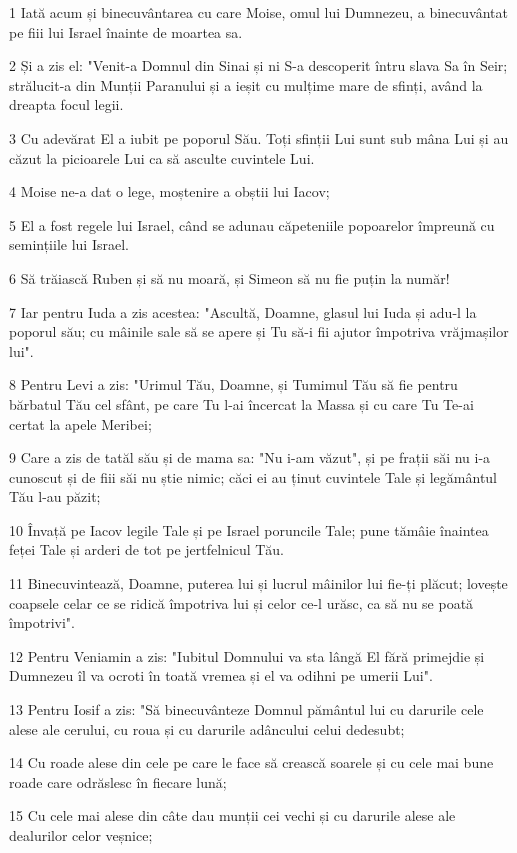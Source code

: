 \par 1 Iată acum și binecuvântarea cu care Moise, omul lui Dumnezeu, a binecuvântat pe fiii lui Israel înainte de moartea sa.
\par 2 Și a zis el: "Venit-a Domnul din Sinai și ni S-a descoperit întru slava Sa în Seir; strălucit-a din Munții Paranului și a ieșit cu mulțime mare de sfinți, având la dreapta focul legii.
\par 3 Cu adevărat El a iubit pe poporul Său. Toți sfinții Lui sunt sub mâna Lui și au căzut la picioarele Lui ca să asculte cuvintele Lui.
\par 4 Moise ne-a dat o lege, moștenire a obștii lui Iacov;
\par 5 El a fost regele lui Israel, când se adunau căpeteniile popoarelor împreună cu semințiile lui Israel.
\par 6 Să trăiască Ruben și să nu moară, și Simeon să nu fie puțin la număr!
\par 7 Iar pentru Iuda a zis acestea: "Ascultă, Doamne, glasul lui Iuda și adu-l la poporul său; cu mâinile sale să se apere și Tu să-i fii ajutor împotriva vrăjmașilor lui".
\par 8 Pentru Levi a zis: "Urimul Tău, Doamne, și Tumimul Tău să fie pentru bărbatul Tău cel sfânt, pe care Tu l-ai încercat la Massa și cu care Tu Te-ai certat la apele Meribei;
\par 9 Care a zis de tatăl său și de mama sa: "Nu i-am văzut", și pe frații săi nu i-a cunoscut și de fiii săi nu știe nimic; căci ei au ținut cuvintele Tale și legământul Tău l-au păzit;
\par 10 Învață pe Iacov legile Tale și pe Israel poruncile Tale; pune tămâie înaintea feței Tale și arderi de tot pe jertfelnicul Tău.
\par 11 Binecuvintează, Doamne, puterea lui și lucrul mâinilor lui fie-ți plăcut; lovește coapsele celar ce se ridică împotriva lui și celor ce-l urăsc, ca să nu se poată împotrivi".
\par 12 Pentru Veniamin a zis: "Iubitul Domnului va sta lângă El fără primejdie și Dumnezeu îl va ocroti în toată vremea și el va odihni pe umerii Lui".
\par 13 Pentru Iosif a zis: "Să binecuvânteze Domnul pământul lui cu darurile cele alese ale cerului, cu roua și cu darurile adâncului celui dedesubt;
\par 14 Cu roade alese din cele pe care le face să crească soarele și cu cele mai bune roade care odrăslesc în fiecare lună;
\par 15 Cu cele mai alese din câte dau munții cei vechi și cu darurile alese ale dealurilor celor veșnice;
